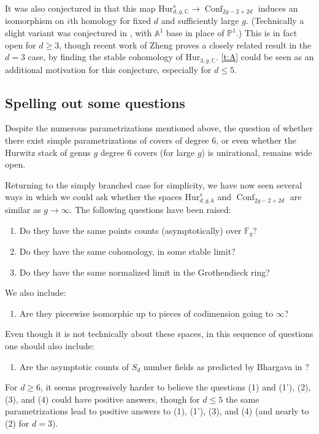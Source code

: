 \documentclass[12 pt]{amsart}
\theoremstyle{plain}
\theoremstyle{definition}
\theoremstyle{remark}
\numberwithin{equation}{section}
\newcommand\ba{\mathbb A}
\newcommand\bc{\mathbb C}
\newcommand\bp{\mathbb P}
\newcommand \ra{\rightarrow}
\newcommand\hur[3]{\mathrm{Hur}_{#1,#2,#3}} %
\newcommand\rhur[4]{\mathrm{Hur}_{#1,#2,#3}^{#4}} %
\DeclareMathOperator\conf{Conf}
\newcommand{\F}{\mathbb F}
\begin{document}
It was also conjectured in
\cite[Conj.\ 1.5]{EllenbergVW:cohenLenstra} that this map
$\rhur d g {\bc} s \to \conf_{2g-2 + 2d}$ induces an isomorphism on $i$th homology
for fixed $d$ and sufficiently large $g$. 
(Technically a slight variant
was conjectured in \cite[Conj.\ 1.5]{EllenbergVW:cohenLenstra}, with $\ba^1$ base in
place of $\bp^1$.)
This is in fact open for $d\geq 3$,
though recent work of Zheng \cite[Thm.\
1.2]{zheng:stable-cohomology-in-the-moduli-space-of-trigonal-curves} proves a closely related result in the $d=3$ case,
by finding the stable cohomology of $\hur 3 g {\bc} $. 
\autoref{t:A} could be seen as an additional motivation for this conjecture, especially for $d\leq 5$. 



\subsection{Spelling out some questions}
Despite the numerous parametrizations mentioned above, the question of 
whether there exist
simple parametrizations of covers of degree $6$, or even whether the Hurwitz
stack of genus $g$ degree $6$ covers (for large $g$) is unirational,
remains wide open.

Returning to the simply branched case for simplicity, 
we have now seen several ways in which we could ask whether the spaces $\rhur d g k s$ and 
$\conf_{2g-2 + 2d}$ are similar as $g\ra\infty$. The following questions have
been raised:
\begin{enumerate}
	\item Do they have the same points counts (asymptotically) over $\F_q$?  
	\item Do they have the same cohomology, in some stable limit?  
	\item Do they have the same normalized limit in the Grothendieck ring?  
\end{enumerate}	
We also include: 
\begin{enumerate}
	\item[(4)] Are they piecewise isomorphic up to pieces of codimension going to $\infty$? 
\end{enumerate}
Even though it is not technically about these spaces, in this sequence of
questions one should also include:
\begin{enumerate}
	\item[(1')] Are the asymptotic counts of $S_d$ number fields as
		predicted by Bhargava in \cite{Bhargava2010}?
\end{enumerate}
For $d\geq 6$, it seems progressively harder to believe the questions (1) and
(1'), (2), (3), and (4) could have positive answers, though for $d\leq 5$ the same parametrizations lead to positive answers to (1), (1'), (3), and (4) (and nearly to (2) for $d=3$).
\end{document}
